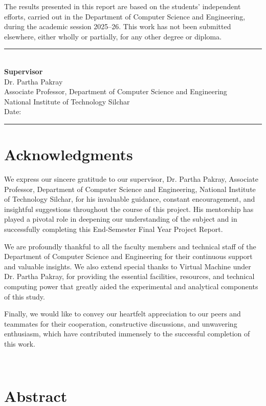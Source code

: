 \documentclass[12pt,oneside]{report}
\newcommand{\Department}{Department of Computer Science and Engineering}
\newcommand{\Institute}{National Institute of Technology Silchar}
\newcommand{\SupervisorName}{Dr. Partha Pakray}
\begin{document}
The results presented in this report are based on the students’ independent efforts, carried out in the Department of  Computer Science and Engineering, during the academic session 2025–26. This work has not been submitted elsewhere, either wholly or partially, for any other degree or diploma.\\[5em]
\noindent
\rule{0.35\linewidth}{0.4pt}\\
\textbf{Supervisor}\\
\SupervisorName\\
Associate Professor, Department of Computer Science and Engineering\\
National Institute of Technology Silchar\\[4.0em]
\noindent Date: \rule{0.25\linewidth}{0.4pt} 

\newpage


\setcounter{page}{1}
\chapter*{Acknowledgments}

{
We express our sincere gratitude to our supervisor, \SupervisorName, Associate Professor, Department of Computer Science and Engineering, \Institute, for his invaluable guidance, constant encouragement, and insightful suggestions throughout the course of this project. His mentorship has played a pivotal role in deepening our understanding of the subject and in successfully completing this End-Semester Final Year Project Report.

We are profoundly thankful to all the faculty members and technical staff of the \Department{} for their continuous support and valuable insights. We also extend special thanks to Virtual Machine under \SupervisorName,  for providing the essential facilities, resources, and technical computing power that greatly aided the experimental and analytical components of this study.

Finally, we would like to convey our heartfelt appreciation to our peers and teammates for their cooperation, constructive discussions, and unwavering enthusiasm, which have contributed immensely to the successful completion of this work.
}\\[2.5em]


\newpage

\chapter*{Abstract}
\end{document}
